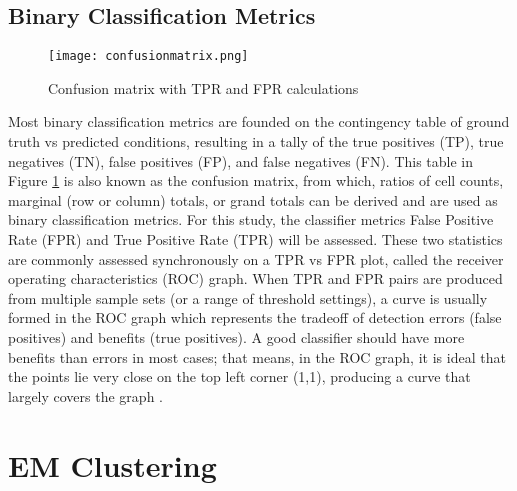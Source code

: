 \subsection{Binary Classification Metrics}
\label{sec:evalmetric_ch3_binclass}
\begin{figure}[h]
    \centering
    \texttt{[image: confusionmatrix.png]}
    \caption[Confusion matrix with TPR and FPR calculations]{Confusion matrix with TPR and FPR calculations}
        \label{fig:confusionmatrix}
\end{figure}

Most binary classification metrics are founded on the contingency table of ground truth vs predicted conditions, resulting in a tally of the true positives (TP), true negatives (TN), false positives (FP), and false negatives (FN). This table in Figure \ref{fig:confusionmatrix} is also known as the confusion matrix, from which, ratios of cell counts, marginal (row or column) totals, or grand totals can be derived and are used as binary classification metrics. For this study, the classifier metrics False Positive Rate (FPR) and True Positive Rate (TPR) will be assessed. These two statistics are commonly assessed synchronously on a TPR vs FPR plot, called the receiver operating characteristics (ROC) graph. When TPR and FPR pairs are produced from multiple sample sets (or a range of threshold settings), a curve is usually formed in the ROC graph which represents the tradeoff of detection errors (false positives) and benefits (true positives). A good classifier should have more benefits than errors in most cases; that means, in the ROC graph, it is ideal that the points lie very close on the top left corner (1,1), producing a curve that largely covers the graph \cite{Fawcett2006}.


\section{EM Clustering}
\label{sec:modelbased_ch3}

